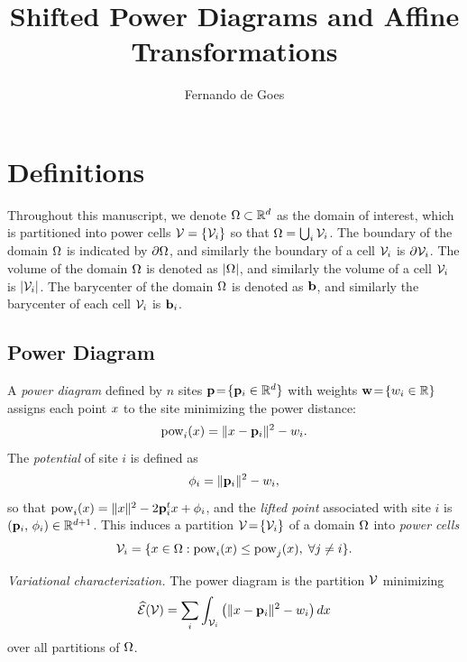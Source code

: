 \documentclass[11pt,a4paper]{article}
\title{Shifted Power Diagrams and Affine Transformations}
\author{Fernando de Goes}
\date{}
\begin{document}
\maketitle

\section{Definitions}\label{sec:definitions}

Throughout this manuscript, we denote $\Omega \subset \mathbb{R}^{d}$ as the domain of interest, which is partitioned into power cells $\mathcal{V} = \{\mathcal{V}_i\}$ so that $\Omega = \bigcup_i \mathcal{V}_i$.
The boundary of the domain $\Omega$ is indicated by $\partial\Omega$, and similarly the boundary of a cell $\mathcal{V}_i$ is $\partial\mathcal{V}_i$.
The volume of the domain $\Omega$ is denoted as $|\Omega|$, and similarly the volume of a cell $\mathcal{V}_i$ is $|\mathcal{V}_i|$.
The barycenter of the domain $\Omega$ is denoted as $\mathbf{b}$, and similarly the barycenter of each cell $\mathcal{V}_i$ is $\mathbf{b}_i$.

\subsection{Power Diagram}\label{sec:power-diagram}

A \emph{power diagram} defined by $n$ sites $\mathbf{p} \!=\! \{ \mathbf{p}_i \in \mathbb{R}^{d} \}$ with weights $\mathbf{w} \!=\!\{ w_i \in \mathbb{R} \}$ assigns each point $x$ to the site minimizing the power distance:
\begin{equation}
  \mathrm{pow}_i(x) = \|x - \mathbf{p}_i\|^2 - w_i.
\end{equation}
The \emph{potential} of site $i$ is defined as
\begin{equation}\label{eq:potential}
  \phi_i = \|\mathbf{p}_i\|^2 - w_i,
\end{equation}
so that $\mathrm{pow}_i(x) = \|x\|^2 - 2\mathbf{p}_i^tx + \phi_i$, and the \emph{lifted point} associated with site $i$ is $(\mathbf{p}_i,\, \phi_i) \in \mathbb{R}^{d+1}$.
This induces a partition $\mathcal{V}\!=\!\{\mathcal{V}_i\}$ of a domain $\Omega$ into \emph{power cells}
\begin{equation}
  \mathcal{V}_i = \{x \in \Omega : \mathrm{pow}_i(x) \leq \mathrm{pow}_j(x),\; \forall j \neq i\}.
\end{equation}

\emph{Variational characterization.} The power diagram is the partition $\mathcal{V}$ minimizing
\begin{equation}
\label{eq:pdEnergy}
\widehat{\mathcal{E}}(\mathcal{V}) = \sum_i \int_{\mathcal{V}_i} \left(\|x - \mathbf{p}_i\|^2 - w_i\right) dx
\end{equation}
over all partitions of $\Omega$.
\end{document}
